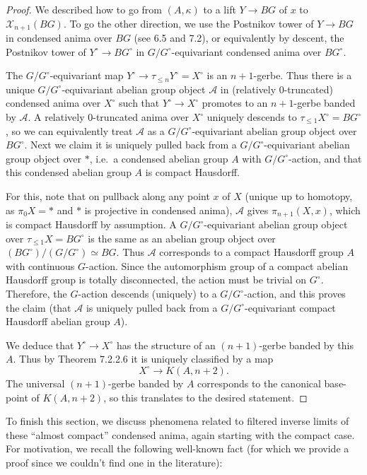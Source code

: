 \documentclass[12pt]{article}
\theoremstyle{definition}
\newcommand{\mc}{\mathcal}
\begin{document}
\begin{proof}
We described how to go from $(A,\kappa)$ to a lift $Y\to BG$ of $x$ to $\mc{X}_{n+1}(BG)$.  To go the other direction, we use the Postnikov tower of $Y\to BG$ in condensed anima over $BG$ (see \cite{htt} 6.5 and 7.2), or equivalently by descent, the Postnikov tower of $Y^\circ \to BG^\circ$ in $G/G^\circ$-equivariant condensed anima over $BG^\circ$.

The $G/G^\circ$-equivariant map $Y^\circ\to \tau_{\leq n}Y^\circ =X^\circ$ is an $n+1$-gerbe.  Thus there is a unique $G/G^\circ$-equivariant abelian group object $\mc{A}$ in (relatively $0$-truncated) condensed anima over $X^\circ$ such that $Y^\circ \to X^\circ$ promotes to an $n+1$-gerbe banded by $\mc{A}$.  A relatively $0$-truncated anima over $X^\circ$ uniquely descends to $\tau_{\leq 1}X^\circ = BG^\circ$, so we can equivalently treat $\mc{A}$ as a $G/G^\circ$-equivariant abelian group object over $BG^\circ$.  Next we claim it is uniquely pulled back from a $G/G^\circ$-equivariant abelian group object over $\ast$, i.e.\ a condensed abelian group $A$ with $G/G^\circ$-action, and that this condensed abelian group $A$ is compact Hausdorff.

For this, note that on pullback along any point $x$ of $X$ (unique up to homotopy, as $\pi_0X=\ast$ and $\ast$ is projective in condensed anima), $\mathcal{A}$ gives $\pi_{n+1}(X,x)$, which is compact Hausdorff by assumption.  A $G/G^\circ$-equivariant abelian group object over $\tau_{\leq 1}X = BG^\circ$ is the same as an abelian group object over $(BG^\circ)/(G/G^\circ)\simeq BG$.  Thus $\mathcal{A}$ corresponds to a compact Hausdorff group $A$ with continuous $G$-action.  Since the automorphism group of a compact abelian Hausdorff group is totally disconnected, the action must be trivial on $G^\circ$.  Therefore, the $G$-action descends (uniquely) to a $G/G^\circ$-action, and this proves the claim (that $\mathcal{A}$ is uniquely pulled back from a $G/G^\circ$-equivariant compact Hausdorff abelian group $A$).

We deduce that $Y^\circ \to X^\circ$ has the structure of an $(n+1)$-gerbe banded by this $A$.  Thus by \cite{htt} Theorem 7.2.2.6 it is uniquely classified by a map
$$X^\circ \to K(A,n+2).$$
The universal $(n+1)$-gerbe banded by $A$ corresponds to the canonical base-point of $K(A,n+2)$, so this translates to the desired statement.
\end{proof}

To finish this section, we discuss phenomena related to filtered inverse limits of these ``almost compact'' condensed anima, again starting with the compact case.  For motivation, we recall the following well-known fact (for which we provide a proof since we couldn't find one in the literature):
\end{document}
